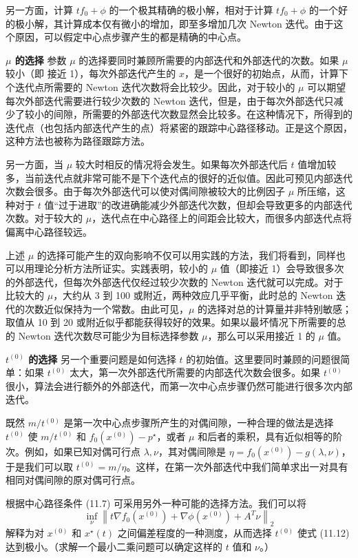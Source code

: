 \documentclass[UTF8,12pt,a4paper,fontset=fandol]{ctexart}
\begin{document}
另一方面，计算 $tf_0+\phi$ 的一个极其精确的极小解，相对于计算 $tf_0+\phi$ 的一个好的极小解，其计算成本仅有微小的增加，即至多增加几次 Newton 迭代。由于这个原因，可以假定中心点步骤产生的都是精确的中心点。

\noindent\textbf{$\mu$ 的选择}\quad
参数 $\mu$ 的选择要同时兼顾所需要的内部迭代和外部迭代的次数。如果 $\mu$ 较小（即
接近 1），每次外部迭代产生的 $x$，是一个很好的初始点，从而，计算下个迭代点所需要的 Newton 迭代次数将会比较少。因此，对于较小的 $\mu$ 可以期望每次外部迭代需要进行较少次数的 Newton 迭代，但是，由于每次外部迭代只减少了较小的间隙，所需要的外部迭代次数显然会比较多。在这种情况下，所得到的迭代点（也包括内部迭代产生的点）将紧密的跟踪中心路径移动。正是这个原因，这种方法也被称为路径跟踪方法。

另一方面，当 $\mu$ 较大时相反的情况将会发生。如果每次外部迭代后 $t$ 值增加较多，当前迭代点就非常可能不是下个迭代点的很好的近似值。因此可预见内部迭代次数会很多。由于每次外部迭代可以使对偶间隙被较大的比例因子 $\mu$ 所压缩，这种对于 $t$ 值``过于进取''的改进确能减少外部迭代次数，但却会导致更多的内部迭代次数。对于较大的 $\mu$，迭代点在中心路径上的间距会比较大，而很多内部迭代点将偏离中心路径较远。

上述 $\mu$ 的选择可能产生的双向影响不仅可以用实践的方法，我们将看到，同样也可以用理论分析方法所证实。实践表明，较小的 $\mu$ 值（即接近 1）会导致很多次的外部迭代，但每次外部迭代仅经过较少次数的 Newton 迭代就可以完成。对于比较大的 $\mu$，大约从 3 到 100 或附近，两种效应几乎平衡，此时总的 Newton 迭代的次数近似保持为一个常数。由此可见，$\mu$ 的选择对总的计算量并非特别敏感；取值从 10 到 20 或附近似乎都能获得较好的效果。如果以最坏情况下所需要的总的 Newton 迭代次数尽可能少为目标选择参数 $\mu$，那么可以采用接近 1 的 $\mu$ 值。

\noindent\textbf{$t^{(0)}$ 的选择}\quad
另一个重要问题是如何选择 $t$ 的初始值。这里要同时兼顾的问题很简单：如果 $t^{(0)}$ 太大，第一次外部迭代所需要的内部迭代次数会很多。如果 $t^{(0)}$ 很小，算法会进行额外的外部迭代，而第一次中心点步骤仍然可能进行很多次内部迭代。

既然 $m/t^{(0)}$ 是第一次中心点步骤所产生的对偶间隙，一种合理的做法是选择 $t^{(0)}$ 使 $m/t^{(0)}$ 和 $f_0(x^{(0)})-p^\star$，或者 $\mu$ 和后者的乘积，具有近似相等的阶次。例如，如果已知对偶可行点 $\lambda,\nu$，其对偶间隙是 $\eta=f_0(x^{(0)})-g(\lambda,\nu)$，于是我们可以取 $t^{(0)}=m/\eta$。这样，在第一次外部迭代中我们简单求出一对具有相同对偶间隙的原对偶可行点。

根据中心路径条件 (11.7) 可采用另外一种可能的选择方法。我们可以将
\begin{equation}
\inf_\nu\left\|t\nabla f_0(x^{(0)})+\nabla\phi(x^{(0)})+A^T\nu\right\|_2
\tag{11.12}
\end{equation}
解释为对 $x^{(0)}$ 和 $x^\star(t)$ 之间偏差程度的一种测度，从而选择 $t^{(0)}$ 使式 (11.12) 达到极小。（求解一个最小二乘问题可以确定这样的 $t$ 值和 $\nu$。）
\end{document}
